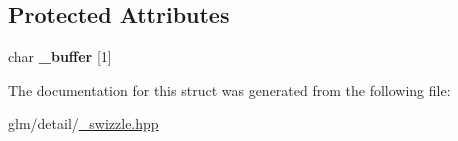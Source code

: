 \subsection*{Protected Attributes}
\begin{DoxyCompactItemize}
\item 
\hypertarget{structglm_1_1detail_1_1__swizzle__base0_afd4b7f15c9acff4cdef808f559ffec2d}{char {\bfseries \-\_\-buffer} \mbox{[}1\mbox{]}}\label{structglm_1_1detail_1_1__swizzle__base0_afd4b7f15c9acff4cdef808f559ffec2d}

\end{DoxyCompactItemize}


The documentation for this struct was generated from the following file\-:\begin{DoxyCompactItemize}
\item 
glm/detail/\hyperlink{__swizzle_8hpp}{\-\_\-swizzle.\-hpp}\end{DoxyCompactItemize}
